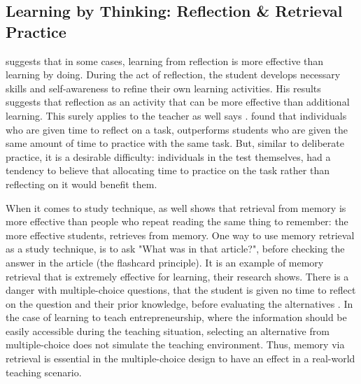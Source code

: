   \subsection{Learning by Thinking: Reflection \& Retrieval Practice}\label{learningbythinking}

  \cite{stefano} suggests that in some cases, learning from reflection is more effective than learning by doing. During the act of reflection, the student develops necessary skills and self-awareness to refine their own learning activities. His results suggests that reflection as an activity that can be more effective than additional learning. This surely applies to the teacher as well says \cite{luckin}. \cite{stefano} found that individuals who are given time to reflect on a task, outperforms students who are given the same amount of time to practice with the same task. But, similar to deliberate practice, it is a desirable difficulty: individuals in the test themselves, had a tendency to believe that allocating time to practice on the task rather than reflecting on it would benefit them.


  When it comes to study technique, \cite{bjork} as well shows that retrieval from memory is more effective than people who repeat reading the same thing to remember: the more effective students, retrieves from memory. One way to use memory retrieval as a study technique, is to ask "What was in that article?", before checking the answer in the article (the flashcard principle). It is an example of memory retrieval that is extremely effective for learning, their research shows. There is a danger with multiple-choice questions, that the student is given no time to reflect on the question and their prior knowledge, before evaluating the alternatives \citep{nicol}. In the case of learning to teach entrepreneurship, where the information should be easily accessible during the teaching situation, selecting an alternative from multiple-choice does not simulate the teaching environment. Thus, memory via retrieval is essential in the multiple-choice design to have an effect in a real-world teaching scenario.



%
